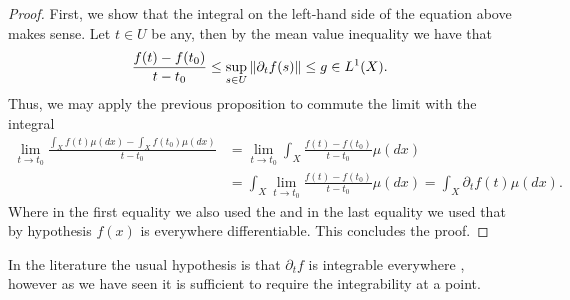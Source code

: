 \documentclass[
    a4paper,
    DIV=14,
    abstract=true,
    numbers=noenddot
]{scrartcl}
\begin{document}
\begin{proof}
	First, we show that the integral on the left-hand side of the equation above makes sense. Let $t\in U$ be any, then by the mean value inequality we have that
	\begin{equation*}
		\frac{f(t)-f(t_0)}{t-t_0}\leq \sup_{s \in U}\left\lVert \partial _t f(s) \right\rVert\leq g \in L^1(X).
	\end{equation*}
	Thus, we may apply the previous proposition to commute the limit with the integral
	\begin{align*}
		\lim_{t \to t_0}\frac{\int_{X} f(t)\mu (dx)-\int_{X}f(t_0) \mu (dx)}{t-t_0}  &=\lim_{t \to t_0}\int_{X}    \frac{f(t)-f(t_0)}{t-t_0} \mu (dx) 
\\&=\int_{X}\lim_{t \to t_0} \frac{f(t)-f(t_0)}{t-t_0} \mu (dx) =\int_{X}\partial _t f(t) \mu(dx).
	\end{align*}
	Where in the first equality we also used the   and in the last equality we used that by hypothesis $f(x)$ is everywhere differentiable. This concludes the proof.
\end{proof}
In the literature the usual hypothesis is that $\partial _t f$ is integrable everywhere \cite[p. 108]{FF}, however as we have seen it is sufficient to require the integrability at a point.
\end{document}

